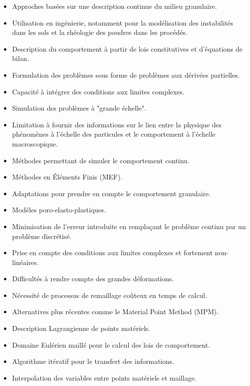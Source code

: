\begin{itemize}


    \item Approches basées sur une description continue du milieu granulaire.
    \item Utilisation en ingénierie, notamment pour la modélisation des instabilités dans les sols et la rhéologie des poudres dans les procédés.
    \item Description du comportement à partir de lois constitutives et d'équations de bilan.
    \item Formulation des problèmes sous forme de problèmes aux dérivées partielles.
    \item Capacité à intégrer des conditions aux limites complexes.
    \item Simulation des problèmes à "grande échelle".
    \item Limitation à fournir des informations sur le lien entre la physique des phénomènes à l'échelle des particules et le comportement à l'échelle macroscopique.
    \item Méthodes permettant de simuler le comportement continu.
    \item Méthodes en Éléments Finis (MEF).
    \item Adaptations pour prendre en compte le comportement granulaire.
    \item Modèles poro-elasto-plastiques.
    \item Minimisation de l'erreur introduite en remplaçant le problème continu par un problème discrétisé.
    \item Prise en compte des conditions aux limites complexes et fortement non-linéaires.
    \item Difficultés à rendre compte des grandes déformations.
    \item Nécessité de processus de remaillage coûteux en temps de calcul.
    \item Alternatives plus récentes comme le Material Point Method (MPM).
    \item Description Lagrangienne de points matériels.
    \item Domaine Eulérien maillé pour le calcul des lois de comportement.
    \item Algorithme itératif pour le transfert des informations.
    \item Interpolation des variables entre points matériels et maillage.
\end{itemize}
